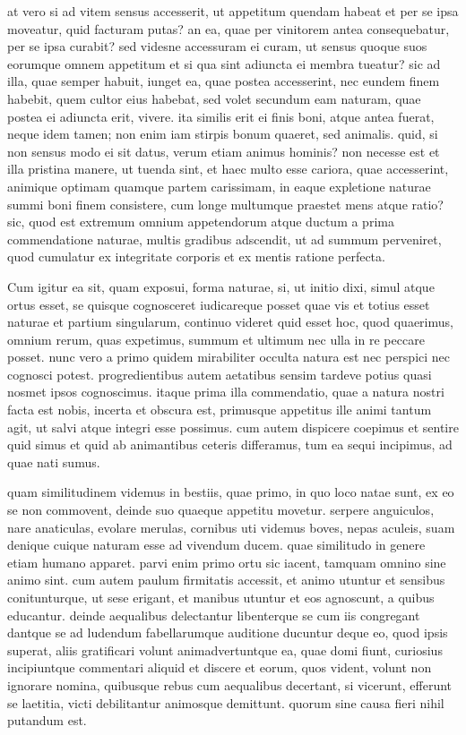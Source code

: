  at vero si ad vitem sensus accesserit, ut appetitum quendam habeat et per se ipsa moveatur, quid facturam putas? an ea, quae per vinitorem antea consequebatur, per se ipsa curabit? sed videsne accessuram ei curam, ut sensus quoque suos eorumque omnem appetitum et si qua sint adiuncta ei membra tueatur? sic ad illa, quae semper habuit, iunget ea, quae postea accesserint, nec eundem finem habebit, quem cultor eius habebat, sed volet secundum eam naturam, quae postea ei adiuncta erit, vivere. ita similis erit ei finis boni, atque antea fuerat, neque idem tamen; non enim iam stirpis bonum quaeret, sed animalis. quid, si non sensus modo ei sit datus, verum etiam animus hominis? non necesse est et illa pristina manere, ut tuenda sint, et haec multo esse cariora, quae accesserint, animique optimam quamque partem carissimam, in eaque expletione naturae summi boni finem consistere, cum longe multumque praestet mens atque ratio? sic, quod est extremum omnium appetendorum atque ductum a prima commendatione naturae, multis gradibus adscendit, ut ad summum perveniret, quod cumulatur ex integritate corporis et ex mentis ratione perfecta.

 Cum igitur ea sit, quam exposui, forma naturae, si, ut initio dixi, simul atque ortus esset, se quisque cognosceret iudicareque posset quae vis et totius esset naturae et partium singularum, continuo videret quid esset hoc, quod quaerimus, omnium rerum, quas expetimus, summum et ultimum nec ulla in re peccare posset. nunc vero a primo quidem mirabiliter occulta natura est nec perspici nec cognosci potest. progredientibus autem aetatibus sensim tardeve potius quasi nosmet ipsos cognoscimus. itaque prima illa commendatio, quae a natura nostri facta est nobis, incerta et obscura est, primusque appetitus ille animi tantum agit, ut salvi atque integri esse possimus. cum autem dispicere coepimus et sentire quid simus et quid ab animantibus ceteris differamus, tum ea sequi incipimus, ad quae nati sumus.

 quam similitudinem videmus in bestiis, quae primo, in quo loco natae sunt, ex eo se non commovent, deinde suo quaeque appetitu movetur. serpere anguiculos, nare anaticulas, evolare merulas, cornibus uti videmus boves, nepas aculeis, suam denique cuique naturam esse ad vivendum ducem. quae similitudo in genere etiam humano apparet. parvi enim primo ortu sic iacent, tamquam omnino sine animo sint. cum autem paulum firmitatis accessit, et animo utuntur et sensibus conitunturque, ut sese erigant, et manibus utuntur et eos agnoscunt, a quibus educantur. deinde aequalibus delectantur libenterque se cum iis congregant dantque se ad ludendum fabellarumque auditione ducuntur deque eo, quod ipsis superat, aliis gratificari volunt animadvertuntque ea, quae domi fiunt, curiosius incipiuntque commentari aliquid et discere et eorum, quos vident, volunt non ignorare nomina, quibusque rebus cum aequalibus decertant, si vicerunt, efferunt se laetitia, victi debilitantur animosque demittunt. quorum sine causa fieri nihil putandum est.


